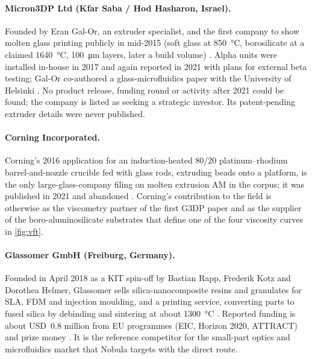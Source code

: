 \paragraph{Micron3DP Ltd (Kfar Saba / Hod Hasharon, Israel).} Founded by Eran Gal-Or, an extruder specialist, and the first company to show molten glass printing publicly in mid-2015 (soft glass at \SI{850}{\celsius}, borosilicate at a claimed \SI{1640}{\celsius}, \SI{100}{\micro\metre} layers, later a  build volume) \citep{micron3dp_acers,micron3dp_3dprint2017}. Alpha units were installed in-house in 2017 and again reported in 2021 with plans for external beta testing; Gal-Or co-authored a glass-microfluidics paper with the University of Helsinki \citep{microfluidics2019}. No product release, funding round or activity after 2021 could be found; the company is listed as seeking a strategic investor. Its patent-pending extruder details were never published.

\paragraph{Corning Incorporated.} Corning's 2016 application for an induction-heated 80/20 platinum--rhodium barrel-and-nozzle crucible fed with glass rods, extruding beads onto a platform, is the only large-glass-company filing on molten extrusion AM in the corpus; it was published in 2021 and abandoned \citep{patent_corning2021}. Corning's contribution to the field is otherwise as the viscometry partner of the first G3DP paper \citep{klein2015} and as the supplier of the boro-aluminosilicate substrates that define one of the four viscosity curves in \cref{fig:vft}.

\paragraph{Glassomer GmbH (Freiburg, Germany).} Founded in April 2018 as a KIT spin-off by Bastian Rapp, Frederik Kotz and Dorothea Helmer, Glassomer sells silica-nanocomposite resins and granulates for SLA, FDM and injection moulding, and a printing service, converting parts to fused silica by debinding and sintering at about \SI{1300}{\celsius} \citep{glassomer_interview,kotz2017,mader2021}. Reported funding is about USD~0.8 million from EU programmes (EIC, Horizon 2020, ATTRACT) and prize money \citep{glassomer_crunchbase}. It is the reference competitor for the small-part optics and microfluidics market that Nobula targets with the direct route.

